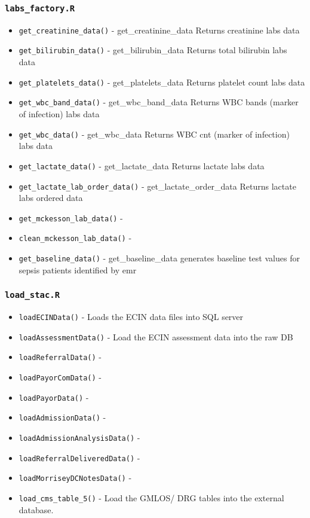 \documentclass[
]{book}
\providecommand{\tightlist}{%
  \setlength{\itemsep}{0pt}\setlength{\parskip}{0pt}}
\begin{document}
\hypertarget{labs_factory.r}{%
\subsubsection{\texorpdfstring{\texttt{labs\_factory.R}}{labs\_factory.R}}\label{labs_factory.r}}

\begin{itemize}
\tightlist
\item
  \texttt{get\_creatinine\_data()} - get\_creatinine\_data Returns creatinine labs data
\item
  \texttt{get\_bilirubin\_data()} - get\_bilirubin\_data Returns total bilirubin labs data
\item
  \texttt{get\_platelets\_data()} - get\_platelets\_data Returns platelet count labs data
\item
  \texttt{get\_wbc\_band\_data()} - get\_wbc\_band\_data Returns WBC bands (marker of infection) labs data
\item
  \texttt{get\_wbc\_data()} - get\_wbc\_data Returns WBC cnt (marker of infection) labs data
\item
  \texttt{get\_lactate\_data()} - get\_lactate\_data Returns lactate labs data
\item
  \texttt{get\_lactate\_lab\_order\_data()} - get\_lactate\_order\_data Returns lactate labs ordered data
\item
  \texttt{get\_mckesson\_lab\_data()} -
\item
  \texttt{clean\_mckesson\_lab\_data()} -
\item
  \texttt{get\_baseline\_data()} - get\_baseline\_data generates baseline test values for sepsis patients identified by emr
\end{itemize}

\hypertarget{load_stac.r}{%
\subsubsection{\texorpdfstring{\texttt{load\_stac.R}}{load\_stac.R}}\label{load_stac.r}}

\begin{itemize}
\tightlist
\item
  \texttt{loadECINData()} - Loads the ECIN data files into SQL server
\item
  \texttt{loadAssessmentData()} - Load the ECIN assessment data into the raw DB
\item
  \texttt{loadReferralData()} -
\item
  \texttt{loadPayorComData()} -
\item
  \texttt{loadPayorData()} -
\item
  \texttt{loadAdmissionData()} -
\item
  \texttt{loadAdmissionAnalysisData()} -
\item
  \texttt{loadReferralDeliveredData()} -
\item
  \texttt{loadMorriseyDCNotesData()} -
\item
  \texttt{load\_cms\_table\_5()} - Load the GMLOS/ DRG tables into the external database.
\end{itemize}
\end{document}
